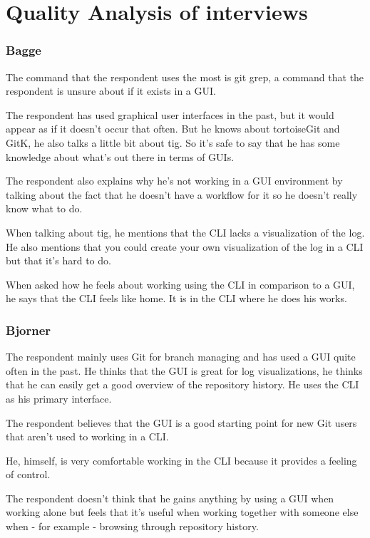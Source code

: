 \documentclass[a4paper,oneside]{bth} %
\begin{document}
		\chapter{Quality Analysis of interviews}
		\subsection{Bagge}
		The command that the respondent uses the most is git grep, a command that the respondent is unsure about if it exists in a GUI.
		
		The respondent has used graphical user interfaces in the past, but it would appear as if it doesn’t occur that often. But he knows about tortoiseGit and GitK, he also talks a little bit about tig. So it’s safe to say that he has some knowledge about what’s out there in terms of GUIs.
		
		The respondent also explains why he’s not working in a GUI environment by talking about the fact that he doesn’t have a workflow for it so he doesn’t really know what to do.
		
		When talking about tig, he mentions that the CLI lacks a visualization of the log. He also mentions that you could create your own visualization of the log in a CLI but that it’s hard to do.
		
		When asked how he feels about working using the CLI in comparison to a GUI, he says that the CLI feels like home. It is in the CLI where he does his works.
		
		
		\subsection{Bjorner}
		The respondent mainly uses Git for branch managing and has used a GUI quite often in the past. He thinks that the GUI is great for log visualizations, he thinks that he can easily get a good overview of the repository history. He uses the CLI as his primary interface.
		
		The respondent believes that the GUI is a good starting point for new Git users that aren’t used to working in a CLI.
		
		He, himself, is very comfortable working in the CLI because it provides a feeling of control.
		
		The respondent doesn’t think that he gains anything by using a GUI when working alone but feels that it’s useful when working together with someone else when - for example - browsing through repository history.
		
\end{document}
